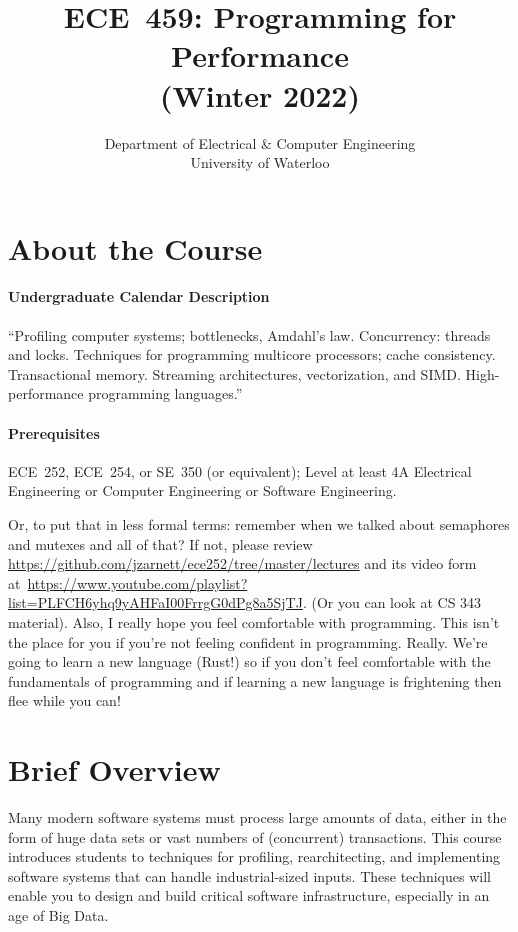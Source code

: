 \documentclass[letterpaper,10pt]{article}
\date{}
\let\LaTeXtitle\title
\renewcommand{\title}[1]{\LaTeXtitle{\textsf{#1}}}
\begin{document}
\title{\bf\LARGE ECE~459: Programming for Performance\\ (Winter 2022)}
\author{Department of Electrical \& Computer Engineering \\
                University of Waterloo}
\renewcommand{\today}{}
\maketitle
\vspace*{-2em}

\section*{About the Course}

\paragraph{Undergraduate Calendar Description} ``Profiling computer systems; bottlenecks, Amdahl's law. Concurrency: threads and locks. Techniques for programming multicore processors; cache consistency. Transactional memory. Streaming architectures, vectorization, and SIMD. High-performance programming languages.''

\paragraph{Prerequisites} ECE~252, ECE~254, or SE~350 (or equivalent); Level at least 4A Electrical Engineering or Computer Engineering or Software Engineering.

Or, to put that in less formal terms: remember when we talked about semaphores and mutexes and all of that? If not, please review~ \url{https://github.com/jzarnett/ece252/tree/master/lectures} and its video form at~\url{https://www.youtube.com/playlist?list=PLFCH6yhq9yAHFaI00FrrgG0dPg8a5SjTJ}. (Or you can look at CS 343 material). Also, I really hope you feel comfortable with programming. This isn't the place for you if you're not feeling confident in programming. Really. We're going to learn a new language (Rust!) so if you don't feel comfortable with the fundamentals of programming and if learning a new language is frightening then flee while you can!

\section*{Brief Overview}

Many modern software systems must process large amounts of data, either in the
form of huge data sets or vast numbers of (concurrent) transactions.  This
course introduces students to techniques for profiling, rearchitecting, and
implementing software systems that can handle industrial-sized
inputs. These techniques will enable you to design and build
critical software infrastructure, especially in an age of Big Data.
\end{document}
